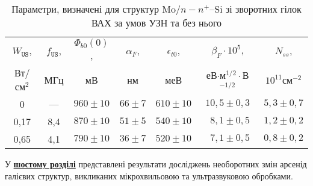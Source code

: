 \begin{table}[hb]
\caption{Параметри, визначені для структур Mo$/n-n^+$--Si зі зворотних гілок ВАХ за умов УЗН та без нього}
\label{tabSDBParZv}
\centering
\begin{tabular}{|c|c|c|c|c|c|c|}
\hline
$W_\mathtt{US}$, &$f_\mathtt{US}$,&$\Phi_{b0}(0)$,&$\alpha_F$,&$\epsilon_{t0}$,&$\beta_F\cdot10^{5}$,&$N_{ss}$,\\
Вт/см$^2$&МГц&мВ&нм&меВ&еВ$\cdot$м$^{1/2}\cdot$В$^{-1/2}$&$10^{11}$см$^{-2}$\\\hline
0&---&$960\pm10$&$66\pm7$&$610\pm10$&$10,5\pm0,3$&$5,3\pm0,7$\\\hline
0,17&8,4&$870\pm10$&$51\pm5$&$540\pm10$&$\;\:8,1\pm0,5$&$1,2\pm0,2$\\\hline
0,65&4,1&$790\pm10$&$36\pm7$&$520\pm10$&$\;\:7,1\pm0,5$&$0,8\pm0,2$\\\hline
\end{tabular}
\end{table}

У  \underline{\textbf{шостому розділі}} представлені результати досліджень необоротних змін арсенід галієвих структур, викликаних мікрохвильовою та ультразвуковою обробками.

